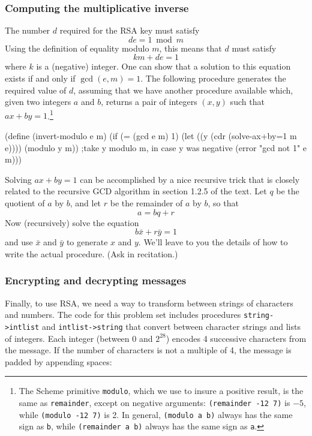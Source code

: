 \subsubsection{Computing the multiplicative inverse}

The number $d$ required for the RSA key must satisfy
\[de=1 \bmod m\]
Using the definition of equality modulo $m$, this means that $d$ must
satisfy
\[km + de=1\]
where $k$ is a (negative) integer.  One can show that a solution to
this equation exists if and only if $\gcd(e,m)=1$.  The following
procedure generates the required value of $d$, assuming that we have
another procedure available which, given two integers $a$ and $b$,
returns a pair of integers $(x,y)$ such that $ax+by=1$.\footnote{The
Scheme primitive {\tt modulo}, which we use to insure a positive
result, is the same as {\tt remainder}, except on negative arguments:
{\tt (remainder -12 7)} is $-5$, while {\tt (modulo -12 7)} is 2.  In
general, {\tt (modulo a b)} always has the same sign as {\tt b}, while
{\tt (remainder a b)} always has the same sign as {\tt a}.}

\beginlisp
(define (invert-modulo e m)
  (if (= (gcd e m) 1)
      (let ((y (cdr (solve-ax+by=1 m e))))
        (modulo y m))   ;take y modulo m, in case y was negative
      (error "gcd not 1" e m)))
\endlisp

Solving $ax+by=1$ can be accomplished by a nice recursive trick that
is closely related to the recursive GCD algorithm in section
1.2.5 of the text.  Let $q$ be the quotient of $a$ by $b$, and let
$r$ be the remainder of $a$ by $b$, so that 
\[a=bq+r\]
Now (recursively) solve the equation
\[b\bar{x}+r\bar{y}=1\]
and use $\bar{x}$ and $\bar{y}$ to generate $x$ and $y$.  We'll leave
to you the details of how to write the actual procedure.  (Ask in
recitation.)

\subsubsection{Encrypting and decrypting messages}

Finally, to use RSA, we need a way to transform between strings of
characters and numbers.  The code for this problem set includes
procedures {\tt string->intlist} and {\tt intlist->string} that
convert between character strings and lists of integers.  Each integer
(between 0 and $2^{28}$) encodes 4 successive characters from the
message.  If the number of characters is not a multiple of 4, the
message is padded by appending spaces:

